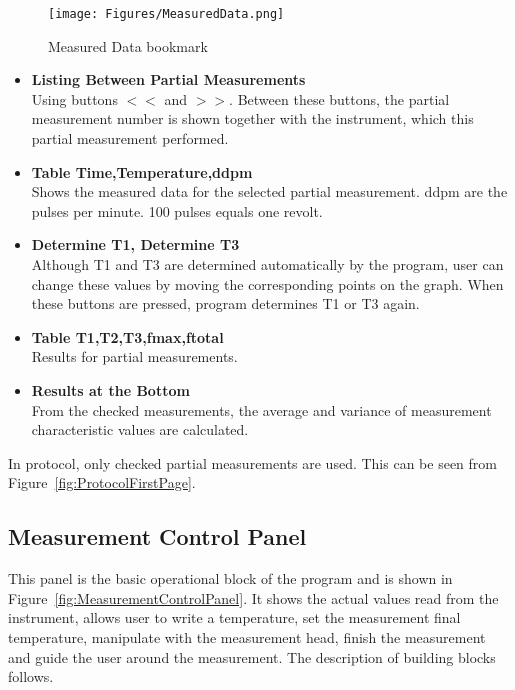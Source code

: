 \documentclass[a4paper,11pt,oneside]{report}
\theoremstyle{named}
\begin{document}
\begin{figure}[t]
  \centering
  \texttt{[image: Figures/MeasuredData.png]}
  \caption{Measured Data bookmark}
  \label{fig:MeasuredData}
\end{figure}

\begin{itemize}
  \item \textbf{Listing Between Partial Measurements} \\
    Using buttons $<<$ and $>>$. Between these buttons, the
    partial measurement number is shown together with the instrument, which
    this partial measurement performed. 
  \item \textbf{Table Time,Temperature,ddpm} \\
    Shows the measured data for the selected partial measurement. ddpm are the pulses
    per minute. 100 pulses equals one revolt. 
  \item \textbf{Determine T1, Determine T3} \\
    Although T1 and T3 are determined automatically by the program, user can
    change these values by moving the corresponding points on the graph.
    When these buttons are pressed, program determines T1 or T3 again. 
  \item \textbf{Table T1,T2,T3,fmax,ftotal} \\
    Results for partial measurements.
  \item \textbf{Results at the Bottom} \\
    From the checked measurements, the average and variance of measurement
    characteristic values are calculated.
\end{itemize}

In protocol, only checked partial measurements are used. This can be seen
from Figure~\ref{fig:ProtocolFirstPage}.

\subsection{Measurement Control Panel}
\label{sec:MeasurementControlPanel}

This panel is the basic operational block of the program and is shown in
Figure~\ref{fig:MeasurementControlPanel}. It shows the actual values read
from the instrument, allows user to write a temperature, set the measurement
final temperature, manipulate with the measurement head, finish the measurement
and guide the user around the measurement. The description of building
blocks follows.
\end{document}
